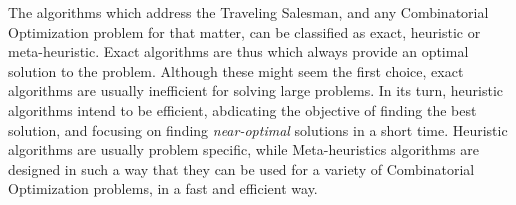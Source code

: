The algorithms which address the Traveling Salesman, and any Combinatorial Optimization problem for that matter,
can be classified as exact, heuristic or meta-heuristic.
Exact algorithms are thus which always provide an optimal solution to the problem.
Although these might seem the first choice, exact algorithms are usually inefficient for solving large problems.
In its turn, heuristic algorithms intend to be efficient, abdicating the objective 
of finding the best solution, and focusing on finding \textit{near-optimal} solutions in a short time.
Heuristic algorithms are usually problem specific,
while Meta-heuristics algorithms are designed in such a way that they can be used 
for a variety of Combinatorial Optimization problems, in a fast and efficient way.



